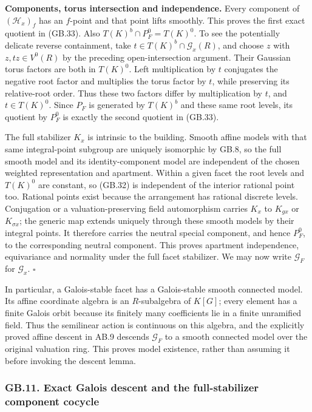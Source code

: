 \documentclass[
  11pt,
]{article}
\begin{document}
\textbf{Components, torus intersection and independence.} Every
component of \((\mathcal H_x)_f\) has an \(f\)-point and that point
lifts smoothly. This proves the first exact quotient in (GB.33). Also
\(T(K)^b\cap P_F^0=T(K)^0\). To see the potentially delicate reverse
containment, take \(t\in T(K)^b\cap\mathcal G_x(R)\), and choose \(z\)
with \(z,tz\in V^0(R)\) by the preceding open-intersection argument.
Their Gaussian torus factors are both in \(T(K)^0\). Left multiplication
by \(t\) conjugates the negative root factor and multiplies the torus
factor by \(t\), while preserving its relative-root order. Thus these
two factors differ by multiplication by \(t\), and \(t\in T(K)^0\).
Since \(P_F\) is generated by \(T(K)^b\) and these same root levels, its
quotient by \(P_F^0\) is exactly the second quotient in (GB.33).

The full stabilizer \(K_x\) is intrinsic to the building. Smooth affine
models with that same integral-point subgroup are uniquely isomorphic by
GB.8, so the full smooth model and its identity-component model are
independent of the chosen weighted representation and apartment. Within
a given facet the root levels and \(T(K)^0\) are constant, so (GB.32) is
independent of the interior rational point too. Rational points exist
because the arrangement has rational discrete levels. Conjugation or a
valuation-preserving field automorphism carries \(K_x\) to \(K_{gx}\) or
\(K_{\sigma x}\); the generic map extends uniquely through these smooth
models by their integral points. It therefore carries the neutral
special component, and hence \(P_F^0\), to the corresponding neutral
component. This proves apartment independence, equivariance and
normality under the full facet stabilizer. We may now write
\(\mathcal G_F\) for \(\mathcal G_x\). \(\square\)

In particular, a Galois-stable facet has a Galois-stable smooth
connected model. Its affine coordinate algebra is an \(R\)-subalgebra of
\(K[G]\); every element has a finite Galois orbit because its finitely
many coefficients lie in a finite unramified field. Thus the semilinear
action is continuous on this algebra, and the explicitly proved affine
descent in AB.9 descends \(\mathcal G_F\) to a smooth connected model
over the original valuation ring. This proves model existence, rather
than assuming it before invoking the descent lemma.

\subsubsection{GB.11. Exact Galois descent and the full-stabilizer
component
cocycle}\label{gb.11.-exact-galois-descent-and-the-full-stabilizer-component-cocycle}
\end{document}
